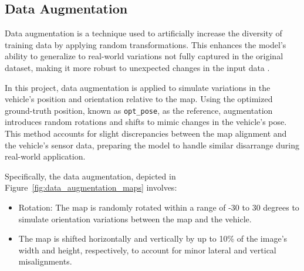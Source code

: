 \subsection{Data Augmentation} 

Data augmentation is a technique used to artificially increase the diversity of training data by applying random transformations. This enhances the model’s ability to generalize to real-world variations not fully captured in the original dataset, making it more robust to unexpected changes in the input data \cite{MUMUNI2022100258}.

In this project, data augmentation is applied to simulate variations in the vehicle's position and orientation relative to the map. Using the optimized ground-truth position, known as \texttt{opt\_pose}, as the reference, augmentation introduces random rotations and shifts to mimic changes in the vehicle’s pose. This method accounts for slight discrepancies between the map alignment and the vehicle’s sensor data, preparing the model to handle similar disarrange during real-world application.

Specifically, the data augmentation, depicted in Figure~\ref{fig:data_augmentation_maps} involves:
\begin{itemize}
    \item Rotation: The map is randomly rotated within a range of -30 to 30 degrees to simulate orientation variations between the map and the vehicle.
    \item The map is shifted horizontally and vertically by up to 10\% of the image’s width and height, respectively, to account for minor lateral and vertical misalignments.
\end{itemize}

